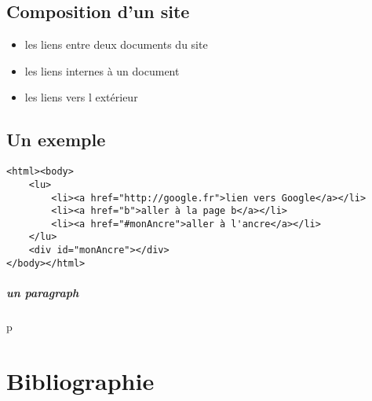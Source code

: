 \documentclass[a4paper]{report}
\begin{document}
\section{Composition d'un site\\}
\begin{itemize}
\item les liens entre deux documents du site
\item les liens internes à un document
\item les liens vers l extérieur
\end{itemize}

\section*{Un exemple\\}
\begin{verbatim}
<html><body>
	<lu>
		<li><a href="http://google.fr">lien vers Google</a></li>
		<li><a href="b">aller à la page b</a></li>
		<li><a href="#monAncre">aller à l'ancre</a></li>
	</lu>
	<div id="monAncre"></div>
</body></html>
\end{verbatim}

\paragraph*{un paragraph}
p


\chapter*{Bibliographie}
\end{document}
